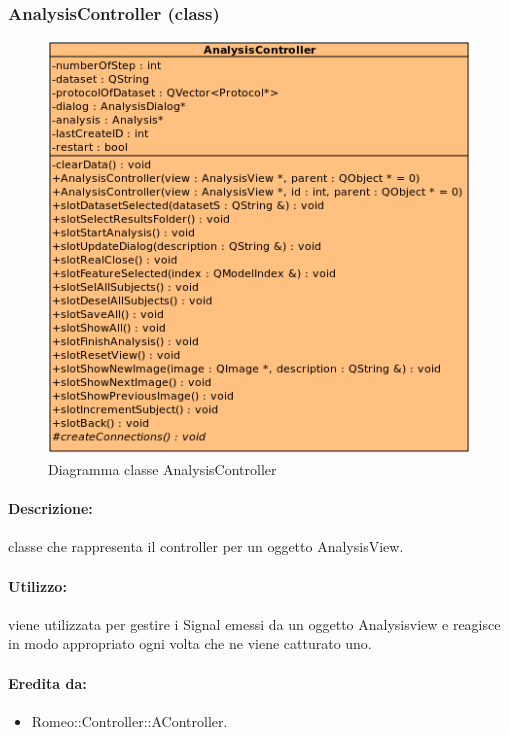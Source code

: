 	\subsubsection{AnalysisController (class)}
	\begin{figure}[!h]
		\centering
		\includegraphics[width=0.65\linewidth]{./Content/Immagini/controller/AnalysisController.png}
		\caption{Diagramma classe AnalysisController}
	\end{figure}
	\paragraph{Descrizione:} classe che rappresenta il controller per un oggetto AnalysisView.
	\paragraph{Utilizzo:} viene utilizzata per gestire i Signal\g{} emessi da un oggetto Analysisview e reagisce in modo appropriato ogni volta che ne viene catturato uno.
	\paragraph{Eredita da:}
		\begin{itemize}
			\item Romeo::Controller::AController.
		\end{itemize}
